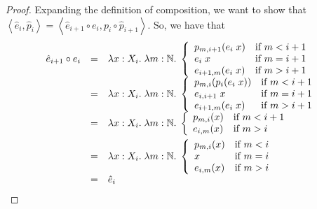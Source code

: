 \begin{proof}
Expanding the definition of composition, we want to show that 
$\left<\hat{e}_i, \hat{p}_i\right> = \left<\hat{e}_{i+1} \circ e_i,
                                          p_i \circ \hat{p}_{i+1} \right>$.
So, we have that
\begin{displaymath}
  \begin{array}{lcl}
    \hat{e}_{i+1} \circ e_i
      & = &     
      \lambda x:X_i.\; \lambda m:\mathbb{N}.\; 
       \left\{ 
          \begin{array}{ll}
            p_{m,{i+1}}(e_i\;x) & \mbox{if } m < i+1 \\
            e_i\;x         & \mbox{if } m = i+1 \\
            e_{{i+1},m}(e_i\;x) & \mbox{if } m > i+1 \\
          \end{array}
       \right. 
   \\[1em]
      & = &     
      \lambda x:X_i.\; \lambda m:\mathbb{N}.\; 
       \left\{ 
          \begin{array}{ll}
            p_{m,i}(p_i(e_i\;x)) & \mbox{if } m < i+1 \\
            e_{i, i+1}\;x         & \mbox{if } m = i+1 \\
            e_{{i+1},m}(e_i\;x) & \mbox{if } m > i+1 \\
          \end{array}
       \right. 
   \\[1em]
     & = & 
      \lambda x:X_i.\; \lambda m:\mathbb{N}.\; 
       \left\{ 
          \begin{array}{ll}
            p_{m,i}(x) & \mbox{if } m < i+1 \\
            e_{i,m}(x) & \mbox{if } m > i \\
          \end{array}
       \right. 
   \\[1em]
     & = & 
      \lambda x:X_i.\; \lambda m:\mathbb{N}.\; 
       \left\{ 
          \begin{array}{ll}
            p_{m,i}(x) & \mbox{if } m < i \\
            x             & \mbox{if } m = i \\
            e_{i,m}(x) & \mbox{if } m > i \\
          \end{array}
       \right. 
   \\[1em]
     & = & \hat{e}_i \\
  \end{array}
\end{displaymath}


\end{proof}
